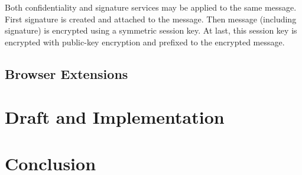 Both confidentiality and signature services may be applied to the same message. First signature is created and attached to the message. Then message (including signature) is encrypted using a symmetric session key. At last, this session key is encrypted with public-key encryption and prefixed to the encrypted message.

\section{Browser Extensions}

\chapter{Draft and Implementation}

\chapter{Conclusion}
